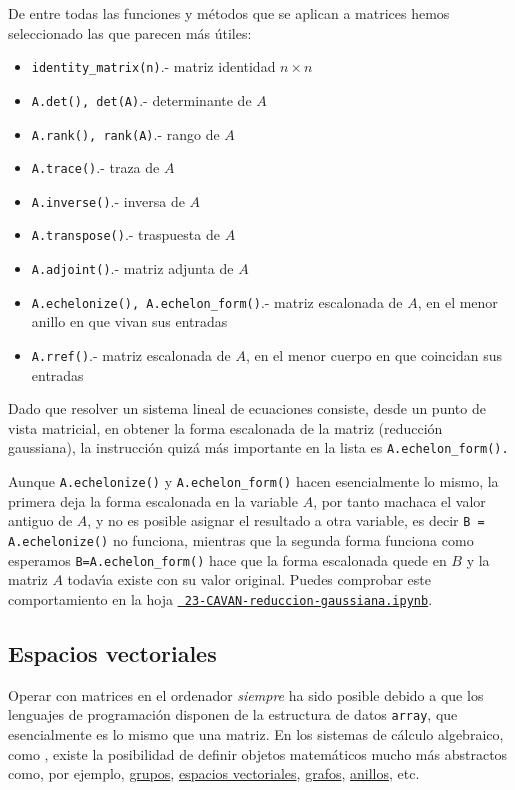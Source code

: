 De entre todas las funciones y m\'etodos que se aplican a matrices hemos
seleccionado las que parecen m\'as \'utiles: 

\def\bfitem#1:{\item\lstinline|#1|.- }
\begin{itemize}
\renewcommand{\labelitemi}{$\circ$}
 \bfitem identity_matrix(n): matriz identidad $n\times n$  
 \bfitem A.det(), det(A): determinante de $A$
 \bfitem A.rank(), rank(A): rango de $A$
 \bfitem A.trace(): traza de $A$
 \bfitem A.inverse(): inversa de $A$
 \bfitem A.transpose(): traspuesta de $A$
 \bfitem A.adjoint(): matriz adjunta de $A$
 \bfitem A.echelonize(), A.echelon_form(): matriz escalonada de $A$, en el
menor anillo en que vivan sus entradas
\bfitem A.rref(): matriz escalonada de $A$, en el menor cuerpo en que coincidan
sus entradas
\end{itemize}

Dado que resolver un sistema lineal de ecuaciones consiste, desde un punto de
vista matricial, en obtener la forma escalonada de la matriz (reducci\'on
gaussiana), la instrucci\'on quiz\'a m\'as importante en la lista es
\lstinline|A.echelon_form().|

Aunque \lstinline|A.echelonize()| y \lstinline|A.echelon_form()| hacen
esencialmente lo mismo, la primera deja la forma escalonada en la variable $A$,
por tanto machaca el valor antiguo de $A$,  y no es posible asignar el resultado
a otra variable, es decir \lstinline|B = A.echelonize()| no funciona, mientras
que  la segunda forma funciona como esperamos \lstinline|B=A.echelon_form()|
hace que 
la forma escalonada quede en $B$ y la matriz $A$ todav\'{\i}a existe con su
valor original. Puedes comprobar este comportamiento en la hoja 
\href{http://localhost:8888/notebooks/CAVAN/23-CAVAN-reduccion-gaussiana.ipynb}{\tt
23-CAVAN-reduccion-gaussiana.ipynb}.

\subsection{Espacios vectoriales}

Operar con matrices en el ordenador {\itshape siempre} ha sido posible debido a
que los lenguajes de programaci\'on disponen de la estructura de datos
\lstinline|array|, que esencialmente es lo mismo que una matriz. En los sistemas
de c\'alculo algebraico, como {\sage}, existe la posibilidad de definir objetos
matem\'aticos mucho m\'as abstractos como, por ejemplo,
\href{http://150.244.21.37/PDFs/CAVAN/quickref-algebra.pdf}{grupos},  
\href{http://150.244.21.37/PDFs/CAVAN/quickref-linalg.pdf}{espacios vectoriales}, 
\href{http://150.244.21.37/PDFs/CAVAN/quickref-graphtheory.pdf}{grafos}, 
\href{http://150.244.21.37/PDFs/CAVAN/quickref-algebra.pdf}{anillos}, etc. 




